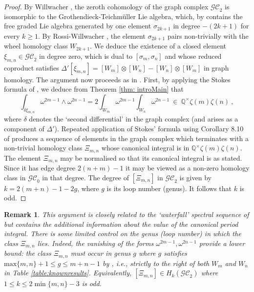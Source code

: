 \documentclass[10pt]{amsart}
\newcommand{\QQ}{{\mathbb Q}}
\theoremstyle{plain}
\newtheorem{remark}[thm]{Remark}
\newcommand{\GC}{\mathcal{GC}}
\newcommand{\0}{\color{blue}{\mathsf{0}}}
\begin{document}
\begin{proof} By Willwacher \cite{WillwacherGRT}, the zeroth cohomology of the graph complex $\GC_2$ is isomorphic to the Grothendieck-Teichm\"uller Lie algebra, which, by \cite{BrMTZ} contains the free graded Lie algebra generated by one element $\sigma_{2k+1}$ in degree $-(2k+1)$ for every $k\geq 1$. By Rossi-Willwacher \cite{RossiWillwacher},
the element $\sigma_{2k+1}$  pairs non-trivially with the wheel homology class $W_{2k+1}$. We deduce the existence of a closed element $\xi_{m,n} \in \GC_2$ in degree zero, which is dual to $[\sigma_m, \sigma_n]$ and whose reduced coproduct satisfies $\Delta'  [\xi_{m,n}] =[W_m] \otimes [W_n] - [W_n] \otimes [W_m]$ in graph homology. The argument now proceeds as in  \cite[Section 10.3]{BrSigma}. 
First, by  applying the Stokes formula of  \cite[\S8]{BrSigma}, we deduce from Theorem \ref{thm: introMain} that 
\[  \int_{\delta  \xi_{m,n}} \omega^{2m-1} \wedge \omega^{2n-1} = 2 \int_{W_m} \omega^{2m-1} \int_{W_n} \omega^{2n-1}   \ \in  \  \QQ^{\times}  \zeta(m)\zeta(n)\ ,  \]
where $\delta$ denotes the `second differential' in the graph complex \cite{SpectralSequenceGC2} (and arises as a component  of $\Delta'$).  Repeated application of Stokes' formula  using Corollary 8.10 of \cite{BrSigma} produces a sequence of elements in the graph complex which terminates with a non-trivial homology class $\Xi_{m,n}$ whose canonical integral is in $\QQ^{\times}  \zeta(m)\zeta(n)$. The element $\Xi_{m,n}$ may be normalised so that its canonical integral is as stated. Since it has edge degree $2(n+m)-1$ it may be viewed as a  non-zero homology class in $\GC_0$ in that degree.
The degree of $[\Xi_{m,n}]$ in $\GC_2$ is given by $k=2(m+n)-1-2g$, where $g$ is its loop number (genus). It follows that $k$  is  odd. 
\end{proof} 

\begin{remark}  This argument is  closely related to the `waterfall' spectral sequence of \cite{SpectralSequenceGC2} but contains the additional information about the value of the canonical period integral. There is some limited control on the genus (loop number) in which the class $\Xi_{m,n}$ lies. Indeed,   the vanishing of the forms $\omega^{2m-1}, \omega^{2n-1}$ provide a lower bound: the class $\Xi_{m,n}$ must occur in genus $g$ where $g$ satisfies $\mathrm{max}\{m,n\}+1  \leq g \leq m+n-1$ by \cite[Lemma 8.4]{BrSigma}, i.e., strictly to the right of both $W_m$ and $W_n$ in  Table \ref{table:knownresults}. Equivalently, $[\Xi_{m,n}]\in H_k(\GC_2)$ where $1\leq k \leq 2 \min \{m,n\}-3 $ is odd.    \end{remark}
\end{document}
